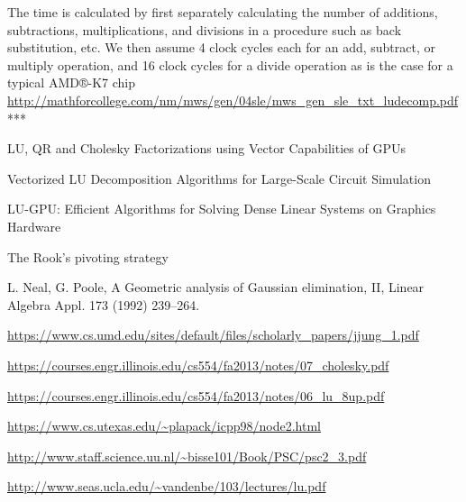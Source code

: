 \documentclass{article}
\begin{document}
The time is calculated by first separately calculating the number of additions, subtractions,
multiplications, and divisions in a procedure such as back substitution, etc. We then assume
4 clock cycles each for an add, subtract, or multiply operation, and 16 clock cycles for a
divide operation as is the case for a typical AMD®-K7 chip
\url{http://mathforcollege.com/nm/mws/gen/04sle/mws_gen_sle_txt_ludecomp.pdf}
***








\pagebreak
\begin{thebibliography}{9}

 LU, QR and Cholesky Factorizations using Vector Capabilities of GPUs

 Vectorized LU Decomposition Algorithms for Large-Scale Circuit Simulation

LU-GPU: Efficient Algorithms for Solving Dense Linear Systems on Graphics Hardware

The Rook’s pivoting strategy

L. Neal, G. Poole, A Geometric analysis of Gaussian elimination, II, Linear Algebra Appl. 173 (1992) 239–264.

 \url{https://www.cs.umd.edu/sites/default/files/scholarly_papers/jjung_1.pdf}

 \url{https://courses.engr.illinois.edu/cs554/fa2013/notes/07_cholesky.pdf}

 \url{https://courses.engr.illinois.edu/cs554/fa2013/notes/06_lu_8up.pdf}

 \url{https://www.cs.utexas.edu/~plapack/icpp98/node2.html}

 \url{http://www.staff.science.uu.nl/~bisse101/Book/PSC/psc2_3.pdf}

 \url{http://www.seas.ucla.edu/~vandenbe/103/lectures/lu.pdf}

\end{thebibliography}
\end{document}
